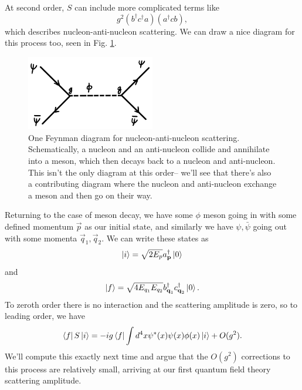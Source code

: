 At second order, $S$ can include more complicated terms like
$$g^2(b^\dagger c^\dagger a)(a^\dagger c b),$$
which describes nucleon-anti-nucleon scattering. We can draw a nice diagram for this process too, seen in Fig. \ref{fig:nucleonscattering1}.

\begin{figure}
    \centering
    \includegraphics[width=0.5\textwidth]{2018/10/20181020_nucleonscattering.png}
    \caption{One Feynman diagram for nucleon-anti-nucleon scattering. Schematically, a nucleon and an anti-nucleon collide and annihilate into a meson, which then decays back to a nucleon and anti-nucleon. This isn't the only diagram at this order-- we'll see that there's also a contributing diagram where the nucleon and anti-nucleon exchange a meson and then go on their way.}
    \label{fig:nucleonscattering1}
\end{figure}

Returning to the case of meson decay, we have some $\phi$ meson going in with some defined momentum $\vec p$ as our initial state, and similarly we have $\psi,\bar \psi$ going out with some momenta $\vec q_1,\vec q_2.$ We can write these states as
$$\left| i \right>=\sqrt{2E_p}a_{\boldsymbol{\mathbf{p}}}^\dagger \left| 0 \right>$$
and
$$\left| f \right>=\sqrt{4E_{q_1}E_{q_2}}b_{\boldsymbol{\mathbf{q}}_1}^\dagger c_{\boldsymbol{\mathbf{q}}_2}^\dagger \left| 0 \right>.$$
To zeroth order there is no interaction and the scattering amplitude is zero, so to leading order, we have
$$\left< f \right|S\left| i \right>=-ig \left< f \right|\int d^4 x \psi^* (x) \psi(x) \phi(x) \left| i \right> + O(g^2).$$
We'll compute this exactly next time and argue that the $O(g^2)$ corrections to this process are relatively small, arriving at our first quantum field theory scattering amplitude.